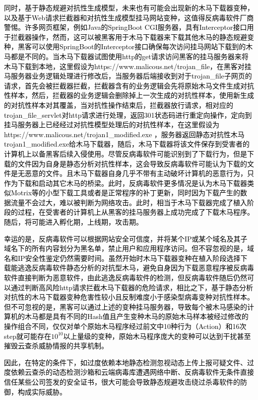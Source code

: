 \textcolor{black}{同时，基于静态规避对抗性生成模型，未来也有可能会出现新的木马下载器变种，以及基于Web请求拦截器和对抗性生成模型挂马网站变种，这值得反病毒软件厂商警惕。许多网页框架，例如Java的SpringBoot CGI服务器，具有Interceptor接口用于拦截器操作，然而，这可以被黑客用于木马下载器来下载其他木马的静态规避变种，黑客可以使用SpringBoot的Interceptor接口确保每次访问挂马网站下载到的木马都是不同的。当木马下载器试图使用http的get请求访问黑客的挂马服务器来将木马下载到本地，这里假设为https://www.malicous.net/trojan\_file，在黑客对挂马服务器业务逻辑处理进行修改后，当服务器后端接收到对于trojan\_file子网页的请求，首先会被拦截器拦截，拦截器含有的业务逻辑会先将原始木马文件生成对抗性样本，然后，拦截器的业务逻辑会删除掉上一次生成的对抗性样本，使用新生成的对抗性样本对其覆盖，当对抗性操作结束后，拦截器放行请求，相对应的trojan\_file\_servlet对http请求进行处理，返回301状态码进行重定向操作，定向到挂马服务器上已经经过对抗性模型处理后的对抗性样本，在这里假设为https://www.malicous.net/trojan1\_modified.exe ，服务器返回静态对抗性木马trojan1\_modified.exe给木马下载器，随后，木马下载器将该文件保存到受害者的计算机上以备黑客后续入侵使用。尽管反病毒软件可能识别到了下载行为，但是下载的文件因为自身是静态分析对抗性样本，这会导致反病毒软件可能认为下载的文件是无恶意的文件。且木马下载器自身几乎不带有主动破坏计算机的恶意行为，只作为下载和启动其它木马的桥梁。此时，反病毒软件更多情况是认为木马下载器类似Motrix等的小型下载工具或者是正常程序的补丁更新，同时因为下载产生的数据流量不会过大，难以被判断为网络攻击。此时，相当于木马下载器完成了植入阶段的过程，在受害者的计算机上从黑客的挂马服务器上成功完成了下载木马程序。随后，将可能进入孵化期，上线期，攻击期\parencite{ref41}。}

\textcolor{black}{幸运的是，反病毒软件可以根据网站安全可信度，并将某个IP或某个域名及其子域名下的所有内容划分为黑名单，禁止用户和应用程序访问。但不容忽视的是，域名和IP安全性鉴定仍然需要时间。虽然开始时木马下载器变种在植入阶段选择下载能逃逸反病毒软件静态分析的对抗型木马，避免自身因为下载恶意程序被反病毒软件直接判断为恶意软件，由此逃逸反病毒软件的检测，但反病毒软件随后仍然可以通过判断高风险http请求拦截木马下载器的危险请求，相比之下，基于静态分析对抗性的木马下载器变种危害性较小且反制难度小于感染型病毒变种对抗性样本。但不可忽视的是，黑客可以通过上述的变种挂马服务器，导致每个被木马感染的计算机的木马都是具有不同的Hash值且产生变种木马的原始木马样本被经过修改的操作组合不同，仅仅对单个原始木马程序经过前文中10种行为（Action）和16次step就可能存在$10^{10}$以上量级的变种，原始木马程序庞大的变种可以达到干扰甚至摧毁云查杀威胁情报的共享机制。}

\textcolor{black}{因此，在特定的条件下，如过度依赖本地静态检测忽视动态上传上报可疑文件、过度依赖云查杀的动态检测沙箱和云端病毒库遭遇网络中断、反病毒软件无条件直接信任某些公司签发的安全证书，很大可能会导致静态规避攻击绕过杀毒软件的防御，构成实际威胁。}

